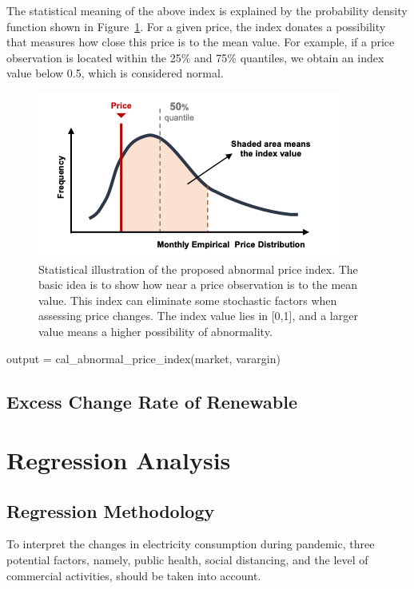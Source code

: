\documentclass[11pt]{article}
\numberwithin{equation}{section}
\numberwithin{table}{section}
\numberwithin{figure}{section}
\begin{document}
The statistical meaning of the above index is explained by the probability density function shown in Figure~\ref{fig:abnormal_price_index}. For a given price, the index donates a possibility that measures how close this price is to the mean value. For example, if a price observation is located within the 25\% and 75\% quantiles, we obtain an index value below 0.5, which is considered normal.
\begin{figure}
  \centering
  \includegraphics[width=.8\textwidth]{figures/abnormal_price_index.png}
  \caption{Statistical illustration of the proposed abnormal price index. The basic idea is to show how near a price observation is to the mean value. This index can eliminate some stochastic factors when assessing price changes. The index value lies in [0,1], and a larger value means a higher possibility of abnormality.}
  \label{fig:abnormal_price_index}
\end{figure}

\begin{Code}
output = cal_abnormal_price_index(market, varargin)
\end{Code}
\subsection{Excess Change Rate of Renewable}





\newpage
\section{Regression Analysis} \label{sec:regression}

\subsection{Regression Methodology}
To interpret the changes in electricity consumption during pandemic, three potential factors, namely, public health, social distancing, and the level of commercial activities, should be taken into account. 
\end{document}
